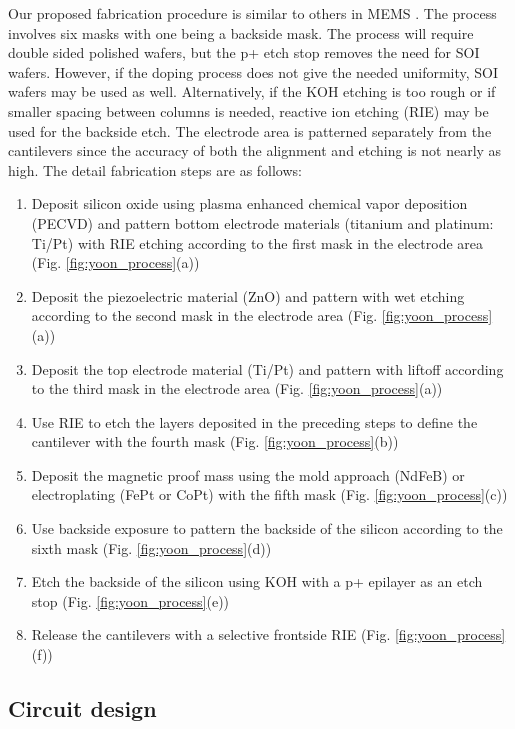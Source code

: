 Our proposed fabrication procedure is similar to others in MEMS \cite{shen2008design}. The process involves six masks with one being a backside mask. The process will require double sided polished wafers, but the p+ etch stop removes the need for SOI wafers. However, if the doping process does not give the needed uniformity, SOI wafers may be used as well. Alternatively, if the KOH etching is too rough or if smaller spacing between columns is needed, reactive ion etching (RIE) may be used for the backside etch. The electrode area is patterned separately from the cantilevers since the accuracy of both the alignment and etching is not nearly as high. The detail fabrication steps are as follows:
\begin{enumerate}
\item Deposit silicon oxide using plasma enhanced chemical vapor deposition (PECVD) and pattern bottom electrode materials (titanium and platinum: Ti/Pt) with RIE etching according to the first mask in the electrode area (Fig. \ref{fig:yoon_process}(a))
\item Deposit the piezoelectric material (ZnO) and pattern with wet etching according to the second mask in the electrode area (Fig. \ref{fig:yoon_process}(a))
\item Deposit the top electrode material (Ti/Pt) and pattern with liftoff according to the third mask in the electrode area (Fig. \ref{fig:yoon_process}(a)) 
\item Use RIE to etch the layers deposited in the preceding steps to define the cantilever with the fourth mask (Fig. \ref{fig:yoon_process}(b))
\item Deposit the magnetic proof mass using the mold approach (NdFeB) or electroplating (FePt or CoPt) with the fifth mask (Fig. \ref{fig:yoon_process}(c))
\item Use backside exposure to pattern the backside of the silicon according to the sixth mask (Fig. \ref{fig:yoon_process}(d))
\item Etch the backside of the silicon using KOH with a p+ epilayer as an etch stop (Fig. \ref{fig:yoon_process}(e))
\item Release the cantilevers with a selective frontside RIE (Fig. \ref{fig:yoon_process}(f))
\end{enumerate}
\subsection{Circuit design}
 
